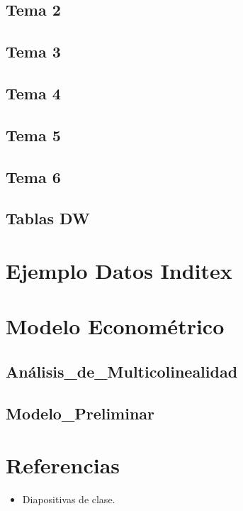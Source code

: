 \documentclass[a4paper,12pt]{article}
\begin{document}
\subsection{Tema 2}

\subsection{Tema 3}

\subsection{Tema 4}

\subsection{Tema 5}

\subsection{Tema 6}

\subsection{Tablas DW}


\section{Ejemplo Datos Inditex}

\section{Modelo Econométrico}
\subsection{Análisis\_de\_Multicolinealidad}

\subsection{Modelo\_Preliminar}



\section{Referencias}
\begin{itemize}
    \item Diapositivas de clase.
\end{itemize}
\end{document}
